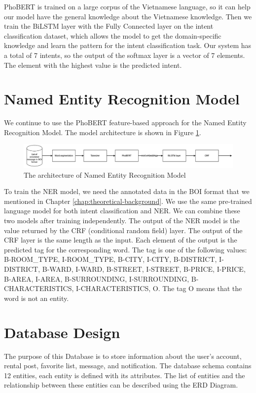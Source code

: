 PhoBERT is trained on a large corpus of the Vietnamese language, so it can help our model have the general knowledge about the Vietnamese knowledge. Then we train the BiLSTM layer with the Fully Connected layer on the intent classification dataset, which allows the model to get the domain-specific knowledge and learn the pattern for the intent classification task. Our system has a total of 7 intents, so the output of the softmax layer is a vector of 7 elements. The element with the highest value is the predicted intent. 

\section{Named Entity Recognition Model}
We continue to use the PhoBERT feature-based approach for the Named Entity Recognition Model. The model architecture is shown in Figure \ref{fig:ner-model}.

\begin{figure}[ht]
    \centering
    \includegraphics[width=\textwidth]{../Images/7.System_Modeling/ner_architecture.png}
    \caption{The architecture of Named Entity Recognition Model}
    \label{fig:ner-model}
\end{figure}

To train the NER model, we need the annotated data in the BOI format that we mentioned in Chapter \ref{chap:theoretical-background}. We use the same pre-trained language model for both intent classification and NER. We can combine these two models after training independently. The output of the NER model is the value returned by the CRF (conditional random field) layer. The output of the CRF layer is the same length as the input. Each element of the output is the predicted tag for the corresponding word. The tag is one of the following values: B-ROOM\_TYPE, I-ROOM\_TYPE, B-CITY, I-CITY, B-DISTRICT, I-DISTRICT, B-WARD, I-WARD, B-STREET, I-STREET, B-PRICE, I-PRICE, B-AREA, I-AREA, B-SURROUNDING, I-SURROUNDING, B-CHARACTERISTICS, I-CHARACTERISTICS, O. The tag O means that the word is not an entity. 

\newpage
\section{Database Design}
The purpose of this Database is to store information about the user's account, rental post, favorite list, message, and notification. The database schema contains 12 entities, each entity is defined with its attributes. The list of entities and the relationship between these entities can be described using the ERD Diagram. 
